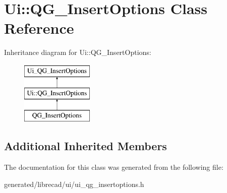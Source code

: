 \hypertarget{classUi_1_1QG__InsertOptions}{\section{Ui\-:\-:Q\-G\-\_\-\-Insert\-Options Class Reference}
\label{classUi_1_1QG__InsertOptions}
}
Inheritance diagram for Ui\-:\-:Q\-G\-\_\-\-Insert\-Options\-:\begin{figure}[H]
\begin{center}
\leavevmode
\includegraphics[height=3.000000cm]{classUi_1_1QG__InsertOptions}
\end{center}
\end{figure}
\subsection*{Additional Inherited Members}


The documentation for this class was generated from the following file\-:\begin{DoxyCompactItemize}
\item 
generated/librecad/ui/ui\-\_\-qg\-\_\-insertoptions.\-h\end{DoxyCompactItemize}
